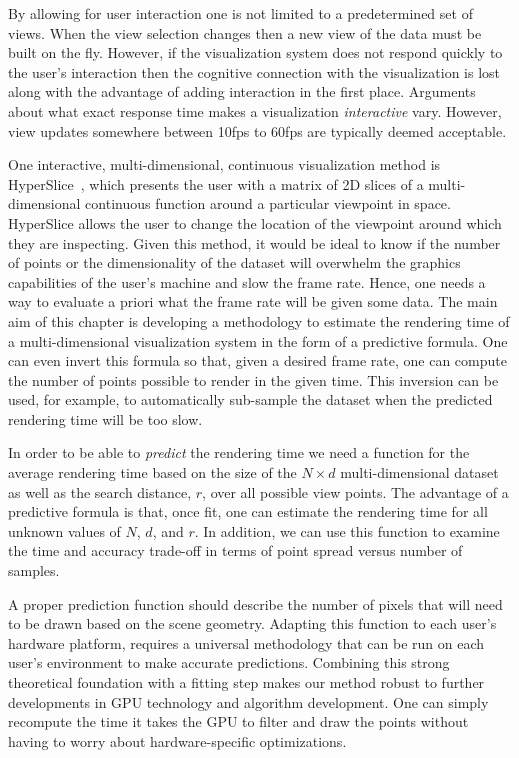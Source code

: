By allowing for user interaction one is not limited to a
predetermined set of views.  
When the view selection changes then a new view of the data must be built
on the fly.
However, if the visualization system does not respond quickly to 
the user's interaction then the cognitive connection with the visualization
is lost~\cite{Shneiderman:1987} along with the advantage of adding 
interaction in the first place.
Arguments about what exact
response time makes a visualization \emph{interactive} vary.  However,
view updates somewhere between 10fps to 60fps are typically deemed acceptable.

One interactive, multi-dimensional, continuous
visualization method
is HyperSlice~\cite{Wijk:1993}, which presents the user
with a matrix of 2D slices of a multi-dimensional continuous function
around a particular viewpoint in space.
HyperSlice allows the user to change the
location of the viewpoint around which they are inspecting.
Given this method, it would be ideal to know if the number of
points or the dimensionality of the dataset will overwhelm the
graphics capabilities of the user's machine and slow the frame rate. 
Hence, one needs a way to evaluate a priori what the frame rate will be
given some data. The main aim of this chapter is developing a methodology to 
estimate the rendering time of a multi-dimensional
visualization system in the form of a predictive formula.
One can even invert this formula so that, given a desired frame rate, 
one can compute the number of points 
possible to render in the given time.
This inversion can be used, for example, 
to automatically sub-sample the dataset when the predicted rendering 
time will be too slow.  

In order to be able to \emph{predict} the rendering time we need a
function for the average rendering time based on the size of the $N \times d$
multi-dimensional dataset as well as the search distance, $r$, over all possible view
points.  The advantage
of a predictive formula is that, once fit, one can estimate the rendering time
for all unknown values of $N$, $d$, and $r$.
In addition, we can use this function to examine the time and accuracy
trade-off in terms of point spread versus number of samples.

A proper prediction function should describe the number
of pixels that will need to be drawn based on the scene geometry.
Adapting this function
to each user's
hardware platform, requires a universal methodology that can be run on
each user's environment to make accurate predictions.
Combining this strong theoretical foundation with a fitting step makes our
method robust to further developments in GPU technology and algorithm 
development. One can simply recompute the time it takes the GPU to filter and
draw the points without having to worry about hardware-specific optimizations.

